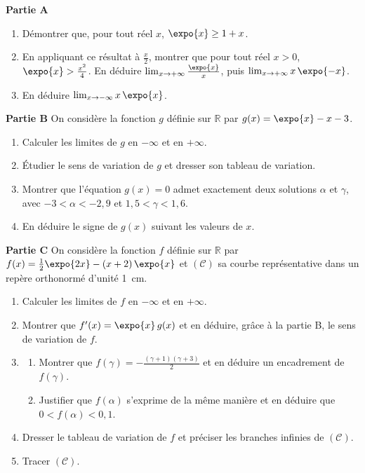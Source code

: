 \begin{exo}
\label{exo:el deux racines}
\textbf{Partie A}
\begin{enumerate}
\item D\'emontrer que, pour tout r\'eel $x$, $\expo{x} \geq 1 + x$.
\item En appliquant ce r\'esultat \`a $\frac{x}{2}$, montrer que pour tout r\'eel $x > 0$, $\expo{x} > \frac{x^2}{4}$.
      En d\'eduire $\lim_{x \rightarrow +\infty} \frac{\expo{x}}{x}$, puis $\lim_{x \rightarrow +\infty} x\,\expo{-x}$.
\item En d\'eduire $\lim_{x \rightarrow -\infty} x\,\expo{x}$.
\end{enumerate}
\textbf{Partie B}
On consid\`ere la fonction $g$ d\'efinie sur $\mathbb{R}$ par $g(x) = \expo{x} - x - 3$.
\begin{enumerate}
\item Calculer les limites de $g$ en $-\infty$ et en $+\infty$.
\item \'Etudier le sens de variation de $g$ et dresser son tableau de variation.
\item Montrer que l'\'equation $g(x) = 0$ admet exactement deux solutions $\alpha$ et $\gamma$, avec
      $-3 < \alpha < -2{,}9$ et $1{,}5 < \gamma < 1{,}6$.
\item En d\'eduire le signe de $g(x)$ suivant les valeurs de $x$.
\end{enumerate}
\textbf{Partie C}
On consid\`ere la fonction $f$ d\'efinie sur $\mathbb{R}$ par $f(x) = \frac{1}{2}\expo{2x} - (x + 2)\,\expo{x}$
et $(\mathscr{C})$ sa courbe repr\'esentative dans un rep\`ere orthonorm\'e d'unit\'e 1~cm.
\begin{enumerate}
\item Calculer les limites de $f$ en $-\infty$ et en $+\infty$.
\item Montrer que $f'(x) = \expo{x}\, g(x)$ et en d\'eduire, gr\^ace \`a la partie B, le sens de variation de $f$.
\item \begin{enumerate}
      \item Montrer que $f(\gamma) = -\frac{(\gamma+1)(\gamma+3)}{2}$ et en d\'eduire un encadrement de $f(\gamma)$.
      \item Justifier que $f(\alpha)$ s'exprime de la m\^eme mani\`ere et en d\'eduire que $0 < f(\alpha) < 0{,}1$.
      \end{enumerate}
\item Dresser le tableau de variation de $f$ et pr\'eciser les branches infinies de $(\mathscr{C})$.
\item Tracer $(\mathscr{C})$.
\end{enumerate}
\end{exo}
